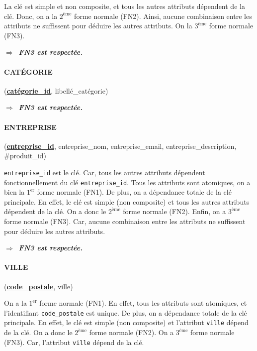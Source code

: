 La clé est simple et non composite, et tous les autres attributs dépendent de la clé. Donc, on a la $2^{\text{ème}}$ forme normale (FN2). Ainsi, aucune combinaison entre les attributs ne suffissent pour déduire les autres attributs. On la $3^{\text{ème}}$ forme normale (FN3).

$\Longrightarrow\:$ \textbf{\textit{FN3 est respectée.}}

\paragraph{CATÉGORIE } (\textbf{\underline{catégorie\_id}}, libellé\_catégorie)

$\Longrightarrow\:$ \textbf{\textit{FN3 est respectée.}}

\paragraph{ENTREPRISE} (\textbf{\underline{entreprise\_id}}, entreprise\_nom, entreprise\_email, entreprise\_description, \#produit\_id)

\texttt{entreprise\_id} est le clé. Car, tous les autres attributs dépendent fonctionnellement du clé \texttt{entreprise\_id}. Tous les attributs sont atomiques, on a bien la $1^{\text{er}}$ forme normale (FN1). De plus, on a dépendance totale de la clé principale. En effet, le clé est simple (non composite) et tous les autres attributs dépendent de la clé. On a donc le $2^{\text{ème}}$ forme normale (FN2). Enfin, on a $3^{\text{ème}}$ forme normale (FN3). Car, aucune combinaison entre les attributs ne suffissent pour déduire les autres attributs.

$\Longrightarrow\:$ \textbf{\textit{FN3 est respectée.}}



\paragraph{VILLE} (\textbf{\underline{code\_postale}}, ville)

On a la $1^{\text{er}}$ forme normale (FN1). En effet, tous les attributs sont atomiques, et l'identifiant \texttt{code\_postale} est unique. De plus, on a dépendance totale de la clé principale. En effet, le clé est simple (non composite) et l'attribut \texttt{ville} dépend de la clé. On a donc le $2^{\text{ème}}$ forme normale (FN2). On a $3^{\text{ème}}$ forme normale (FN3). Car, l'attribut \texttt{ville} dépend de la clé.

